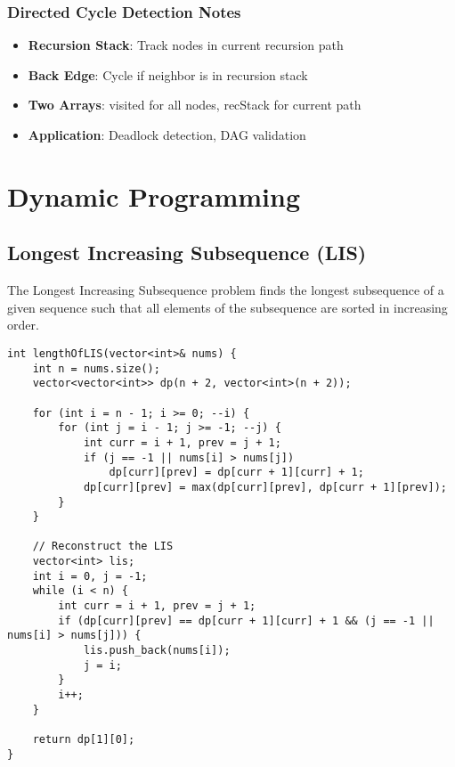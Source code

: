\documentclass[11pt,a4paper]{article}
\begin{document}
\subsubsection{Directed Cycle Detection Notes}
\begin{itemize}
\item \textbf{Recursion Stack}: Track nodes in current recursion path
\item \textbf{Back Edge}: Cycle if neighbor is in recursion stack
\item \textbf{Two Arrays}: visited for all nodes, recStack for current path
\item \textbf{Application}: Deadlock detection, DAG validation
\end{itemize}

\newpage

\section{Dynamic Programming}

\subsection{Longest Increasing Subsequence (LIS)}
The Longest Increasing Subsequence problem finds the longest subsequence of a given sequence such that all elements of the subsequence are sorted in increasing order.

\begin{lstlisting}[caption={LIS - 2D DP Bottom-Up Implementation}]
int lengthOfLIS(vector<int>& nums) {
    int n = nums.size();
    vector<vector<int>> dp(n + 2, vector<int>(n + 2));

    for (int i = n - 1; i >= 0; --i) {
        for (int j = i - 1; j >= -1; --j) {
            int curr = i + 1, prev = j + 1;
            if (j == -1 || nums[i] > nums[j])
                dp[curr][prev] = dp[curr + 1][curr] + 1;
            dp[curr][prev] = max(dp[curr][prev], dp[curr + 1][prev]);
        }
    }

    // Reconstruct the LIS
    vector<int> lis;
    int i = 0, j = -1;
    while (i < n) {
        int curr = i + 1, prev = j + 1;
        if (dp[curr][prev] == dp[curr + 1][curr] + 1 && (j == -1 || nums[i] > nums[j])) {
            lis.push_back(nums[i]);
            j = i;
        }
        i++;
    }

    return dp[1][0];
}
\end{lstlisting}
\end{document}
